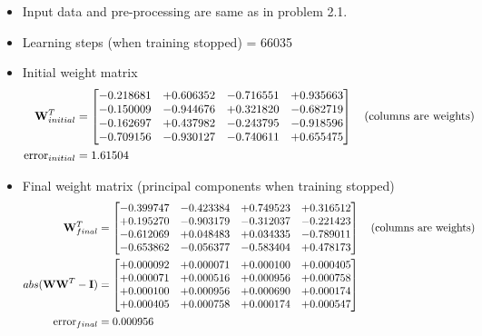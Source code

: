 \documentclass[epsfig]{article}
\begin{document}
\begin{itemize}
	\item Input data and pre-processing are same as in  problem 2.1.
	\item Learning steps (when training stopped) =  66035
	\item Initial weight matrix
		\begin{align*}
			{\bf W}_{initial}^T &=	\begin{bmatrix}
    							-0.218681 & +0.606352 &-0.716551 & +0.935663  \\
    							-0.150009 & -0.944676 & +0.321820 & -0.682719 \\
    							-0.162697 &+0.437982 &-0.243795 &-0.918596  \\
    							-0.709156 & -0.930127 & -0.740611 & +0.655475  \\
						\end{bmatrix} \text{\quad (columns are weights) }\\
			\text{error}_{initial} &= 1.61504 \\
		\end{align*}
	\item Final weight matrix (principal components when training stopped)
		\begin{align*}
			{\bf W}_{final}^T &=	\begin{bmatrix}
    							-0.399747  & -0.423384  & +0.749523 & +0.316512  \\
    							+0.195270 & -0.903179  & -0.312037  & -0.221423 \\
    							-0.612069  & +0.048483 & +0.034335 & -0.789011  \\
    							-0.653862  & -0.056377  &  -0.583404 & +0.478173  \\
						\end{bmatrix} \text{\quad (columns are weights) }\\
			abs({\bf WW}^T-{\bf I} ) &=	\begin{bmatrix}
    									+0.000092 & +0.000071  & +0.000100 & +0.000405  \\
    									+0.000071 & +0.000516  & +0.000956 & +0.000758 \\
    									+0.000100 & +0.000956 	& +0.000690 & +0.000174  \\
    									+0.000405 & +0.000758 	& +0.000174 & +0.000547 \\
								\end{bmatrix} \\
			\text{error}_{final} &=  0.000956 \\

\end{align*}
\end{itemize}
\end{document}
